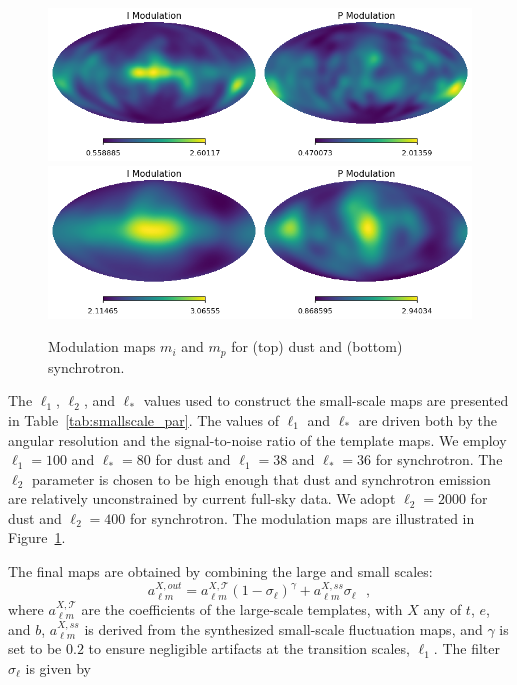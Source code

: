 \documentclass[twocolumn]{aastex631}
\begin{document}
 \begin{figure}
     \centering
     \includegraphics[width=2\columnwidth]{figures/mod_dust.png}\\
      \includegraphics[width=2\columnwidth]{figures/mod_synch.png}\\
     \caption{Modulation maps $m_i$ and $m_p$ for (top) dust and  (bottom) synchrotron. }
     \label{fig:modulation_maps}
 \end{figure}
 
The $\ell_1$, $\ell_2$, and $\ell_*$ values used to construct the small-scale maps are presented in Table~\ref{tab:smallscale_par}. The values of $\ell_1$ and $\ell_*$ are driven both by the angular resolution and the signal-to-noise ratio of the template maps. We employ $\ell_1=100$ and $\ell_*=80$ for dust and $\ell_1=38$ and $\ell_*=36$ for synchrotron. The $\ell_2$ parameter is chosen to be high enough that dust and synchrotron emission are relatively unconstrained by current full-sky data. We adopt  $\ell_2=2000$ for dust and $\ell_2 = 400$ for synchrotron. The modulation maps are illustrated in Figure~\ref{fig:modulation_maps}. %

The final maps are obtained by combining the large and small scales: 
\begin{equation} \label{eq:filter}
    a_{\ell m }^{X, out}=  a_{\ell m }^{X, \mathcal{T}} \left(1-\sigma_\ell\right)^{\gamma} + a_{\ell m }^{X, ss} \sigma_\ell
    ~~~, 
\end{equation}
where $a_{\ell m }^{X, \mathcal{T}}$ are the coefficients of the large-scale templates, with $X$ any of $t$, $e$, and $b$,  $a_{\ell m }^{X, ss}$ is derived from the synthesized small-scale fluctuation maps, and $\gamma$ is set to be  $0.2$ to  ensure negligible artifacts at the transition scales, $\ell_1$. The filter $\sigma_\ell$ is given by
\end{document}
